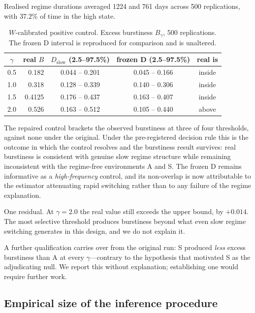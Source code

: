 \documentclass[12pt,letterpaper]{article}
\begin{document}
Realised regime durations averaged 1224 and 761 days across 500 replications, with
$37.2\%$ of time in the high state.

\begin{table}[ht]
\centering
\caption{$W$-calibrated positive control. Excess burstiness $B_\gamma$, 500
replications. The frozen D interval is reproduced for comparison and is unaltered.}
\label{tab:wcontrol}
\begin{tabular}{crccc}
\toprule
$\gamma$ & real $B$ & $D_{\text{slow}}$ (2.5--97.5\%) & frozen D (2.5--97.5\%) & real is \\
\midrule
0.5 & 0.182 & 0.044 -- 0.201 & 0.045 -- 0.166 & inside \\
1.0 & 0.318 & 0.128 -- 0.339 & 0.140 -- 0.306 & inside \\
1.5 & 0.4125 & 0.176 -- 0.437 & 0.163 -- 0.407 & inside \\
2.0 & 0.526 & 0.163 -- 0.512 & 0.105 -- 0.440 & above \\
\bottomrule
\end{tabular}
\end{table}

The repaired control brackets the observed burstiness at three of four thresholds,
against none under the original. Under the pre-registered decision rule this is the
outcome in which the control resolves and the burstiness result survives: real
burstiness is consistent with genuine slow regime structure while remaining
inconsistent with the regime-free environments A and S. The frozen D remains
informative as a \emph{high-frequency} control, and its non-overlap is now attributable
to the estimator attenuating rapid switching rather than to any failure of the regime
explanation.

One residual. At $\gamma = 2.0$ the real value still exceeds the upper bound, by
$+0.014$. The most selective threshold produces burstiness beyond what even slow regime
switching generates in this design, and we do not explain it.

A further qualification carries over from the original run: S produced \emph{less}
excess burstiness than A at every $\gamma$---contrary to the hypothesis that motivated
S as the adjudicating null. We report this without explanation; establishing one would
require further work.

\subsection{Empirical size of the inference procedure}
\label{sec:size}
\end{document}
